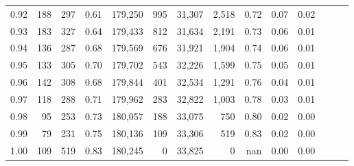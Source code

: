 \begin{tabular}{rrrrrrrrrrrrrr}
0.92 &    188 &  297 &  0.61 &  179,250 &      995 &  31,307 &   2,518 &  0.72 &  0.07 &      0.02 \\
0.93 &    183 &  327 &  0.64 &  179,433 &      812 &  31,634 &   2,191 &  0.73 &  0.06 &      0.01 \\
0.94 &    136 &  287 &  0.68 &  179,569 &      676 &  31,921 &   1,904 &  0.74 &  0.06 &      0.01 \\
0.95 &    133 &  305 &  0.70 &  179,702 &      543 &  32,226 &   1,599 &  0.75 &  0.05 &      0.01 \\
0.96 &    142 &  308 &  0.68 &  179,844 &      401 &  32,534 &   1,291 &  0.76 &  0.04 &      0.01 \\
0.97 &    118 &  288 &  0.71 &  179,962 &      283 &  32,822 &   1,003 &  0.78 &  0.03 &      0.01 \\
0.98 &     95 &  253 &  0.73 &  180,057 &      188 &  33,075 &     750 &  0.80 &  0.02 &      0.00 \\
0.99 &     79 &  231 &  0.75 &  180,136 &      109 &  33,306 &     519 &  0.83 &  0.02 &      0.00 \\
1.00 &    109 &  519 &  0.83 &  180,245 &        0 &  33,825 &       0 &   nan &  0.00 &      0.00 \\
\bottomrule
\end{tabular}

